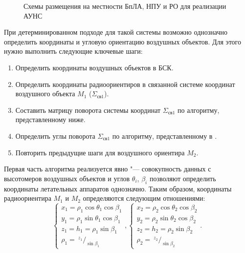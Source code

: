 \documentclass[../main.tex]{subfiles}
\begin{document}
\begin{figure}[htbp]
    \begin{center}



    \caption{Схемы размещения на местности БпЛА, НПУ и РО для реализации АУНС}
    \label{figure:pic3}
    \end{center}
\end{figure}

При детерминированном подходе для такой системы возможно однозначно определить координаты
и угловую ориентацию воздушных объектов. Для этого нужно выполнить следующие ключевые шаги:
\begin{enumerate}
    \item Определить координаты воздушных объектов в БСК.
    \item Определить координаты радиоориентиров в связанной системе координат воздушного объекта $M_1$ ($\Sigma_{\text{св}1}$).
    \item Составить матрицу поворота системы координат $\Sigma_{\text{св}1}$ по алгоритму, представленному ниже.
    \item Определить углы поворота $\Sigma_{\text{св}1}$ по алгоритму, представленному в \cite{antennas}.
    \item Повторить предыдущие шаги для воздушного ориентира $M_2$.
\end{enumerate}

Первая часть алгоритма реализуется явно "--- совокупность данных с высотомеров воздушных
объектов и углов $\theta_i$, $\beta_i$ позволяют определить координаты летательных
аппаратов однозначно. Таким образом, координаты радиоориентира $M_1$ и $M_2$ определяются следующим
отношениями:
\begin{equation}
    \begin{cases}
        x_1 = \rho_1 \cos\theta_1 \cos\beta_1 \\
        y_1 = \rho_1 \sin\theta_1 \cos\beta_1 \\
        z_1 = h_1 = \rho_1 \sin\beta_1 \\
        \rho_1 = ~^{z_1}/_{\sin\beta_1}
    \end{cases},
    \begin{cases}
        x_2 = \rho_2 \cos\theta_2 \cos\beta_2 \\
        y_2 = \rho_2 \sin\theta_2 \cos\beta_2 \\
        z_2 = h_2 = \rho_2 \sin\beta_2 \\
        \rho_2 = ~^{z_2}/_{\sin\beta_2}
    \end{cases}.
\end{equation}
\end{document}
